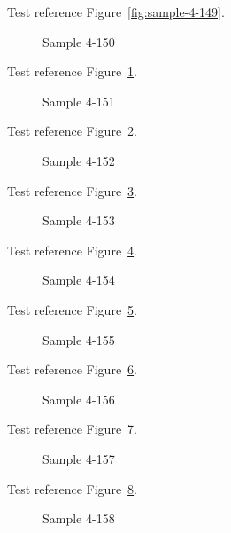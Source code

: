 Test reference Figure~\ref{fig:sample-4-149}.

\begin{figure}[tbhp]
\caption{Sample 4-150}
\label{fig:sample-4-150}
\end{figure}

Test reference Figure~\ref{fig:sample-4-150}.

\begin{figure}[tbhp]
\caption{Sample 4-151}
\label{fig:sample-4-151}
\end{figure}

Test reference Figure~\ref{fig:sample-4-151}.

\begin{figure}[tbhp]
\caption{Sample 4-152}
\label{fig:sample-4-152}
\end{figure}

Test reference Figure~\ref{fig:sample-4-152}.

\begin{figure}[tbhp]
\caption{Sample 4-153}
\label{fig:sample-4-153}
\end{figure}

Test reference Figure~\ref{fig:sample-4-153}.

\begin{figure}[tbhp]
\caption{Sample 4-154}
\label{fig:sample-4-154}
\end{figure}

Test reference Figure~\ref{fig:sample-4-154}.

\begin{figure}[tbhp]
\caption{Sample 4-155}
\label{fig:sample-4-155}
\end{figure}

Test reference Figure~\ref{fig:sample-4-155}.

\begin{figure}[tbhp]
\caption{Sample 4-156}
\label{fig:sample-4-156}
\end{figure}

Test reference Figure~\ref{fig:sample-4-156}.

\begin{figure}[tbhp]
\caption{Sample 4-157}
\label{fig:sample-4-157}
\end{figure}

Test reference Figure~\ref{fig:sample-4-157}.

\begin{figure}[tbhp]
\caption{Sample 4-158}
\label{fig:sample-4-158}
\end{figure}

